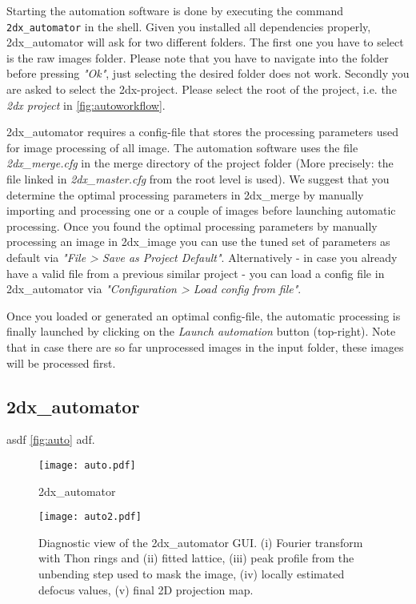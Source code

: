 Starting the automation software is done by executing the command \texttt{2dx\_automator} in the shell. Given you installed all dependencies properly, 2dx\_automator will ask for two different folders. The first one you have to select is the raw images folder. Please note that you have to navigate into the folder before pressing \textit{"Ok"}, just selecting the desired folder does not work. Secondly you are asked to select the 2dx-project. Please select the root of the project, i.e. the \textit{2dx project} in \autoref{fig:autoworkflow}.

2dx\_automator requires a config-file that stores the processing parameters used for image processing of all image. The automation software uses the file \textit{2dx\_merge.cfg} in the merge directory of the project folder (More precisely: the file linked in \textit{2dx\_master.cfg} from the root level is used). We suggest that you determine the optimal processing parameters in 2dx\_merge by manually importing and processing one or a couple of images before launching automatic processing. Once you found the optimal processing parameters by manually processing an image in 2dx\_image you can use the tuned set of parameters as default via \textit{"File > Save as Project Default"}. Alternatively - in case you already have a valid file from a previous similar project - you can load a config file in 2dx\_automator via \textit{"Configuration > Load config from file"}.

Once you loaded or generated an optimal config-file, the  automatic processing is finally launched by clicking on the \textit{Launch automation} button (top-right). Note that in case there are so far unprocessed images in the input folder, these images will be processed first.


\subsection{2dx\_automator}

asdf  \autoref{fig:auto} adf.

\begin{figure}
	\centering
	\texttt{[image: auto.pdf]}
	\caption{2dx\_automator}
	\label{fig:auto}
\end{figure}

\begin{figure}
	\centering
	\texttt{[image: auto2.pdf]}
	\caption{Diagnostic view of the 2dx\_automator GUI. (i) Fourier transform with Thon rings and (ii) fitted lattice, (iii) peak profile from the unbending step used to mask the image, (iv) locally estimated defocus values, (v) final 2D projection map.}
	\label{fig:auto2}
\end{figure}


